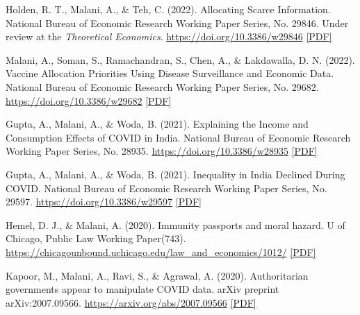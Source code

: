 \begin{tablist}
        \item[2022] \tab{}Holden, R. T., Malani, A., \& Teh, C. (2022). Allocating Scarce Information. National Bureau of Economic Research Working Paper Series, No. 29846. Under review at the \textit{Theoretical Economics}. \href{https://doi.org/10.3386/w29846}{https://doi.org/10.3386/w29846} \href{https://github.com/anup-malani/website_personal/blob/main/publications/2022_HoldenMalani_NBERw29846_AllocatinScarceInfo.pdf}{[PDF]} 

        \item[2022] \tab{}Malani, A., Soman, S., Ramachandran, S., Chen, A., \& Lakdawalla, D. N. (2022). Vaccine Allocation Priorities Using Disease Surveillance and Economic Data. National Bureau of Economic Research Working Paper Series, No. 29682. \href{https://doi.org/10.3386/w29682}{https://doi.org/10.3386/w29682} \href{https://github.com/anup-malani/website_personal/blob/main/publications/2022_Malani_NBERw29682_VaccineAllocationPrioritiesDemand.pdf}{[PDF]} 

        \item[2021] \tab{}Gupta, A., Malani, A., \& Woda, B. (2021). Explaining the Income and Consumption Effects of COVID in India. National Bureau of Economic Research Working Paper Series, No. 28935. \href{https://doi.org/10.3386/w28935}{https://doi.org/10.3386/w28935} \href{https://github.com/anup-malani/website_personal/blob/main/publications/2021_GuptaMalani_NBERw29597_ExplaininIncomeConsumptionCovidIndia.pdf}{[PDF]} 

        \item[2021] \tab{}Gupta, A., Malani, A., \& Woda, B. (2021). Inequality in India Declined During COVID. National Bureau of Economic Research Working Paper Series, No. 29597. \href{https://doi.org/10.3386/w29597}{https://doi.org/10.3386/w29597} \href{https://github.com/anup-malani/website_personal/blob/main/publications/2021_GuptaMalani_NBERw29597_InequalityIndiaCOVID.pdf}{[PDF]} 

        \item[2020] \tab{}Hemel, D. J., \& Malani, A. (2020). Immunity passports and moral hazard. U of Chicago, Public Law Working Paper(743). \href{https://chicagounbound.uchicago.edu/law_and_economics/1012/}{https://chicagounbound.uchicago.edu/law\_and\_economics/1012/} \href{https://github.com/anup-malani/website_personal/blob/main/publications/2020_HemelMalani_ImmunityPassportsMoralHazardCOVID.pdf}{[PDF]}

        \item[2020] \tab{}Kapoor, M., Malani, A., Ravi, S., \& Agrawal, A. (2020). Authoritarian governments appear to manipulate COVID data. arXiv preprint arXiv:2007.09566. \href{https://arxiv.org/abs/2007.09566}{https://arxiv.org/abs/2007.09566} \href{https://github.com/anup-malani/website_personal/blob/main/publications/2020_KapoorMalani_Arxiv_AuthoritarianGovtCOVIDReporting.pdf}{[PDF]}


\end{tablist}
